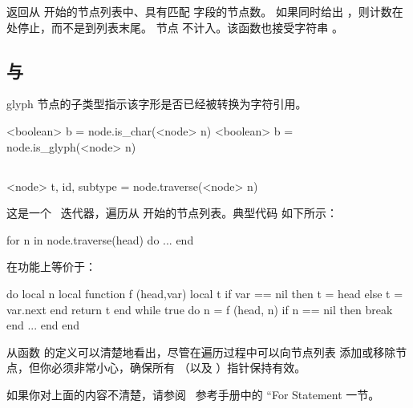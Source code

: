 返回从  开始的节点列表中、具有匹配  字段的节点数。
如果同时给出 ，则计数在  处停止，而不是到列表末尾。
节点  不计入。该函数也接受字符串 。

\subsection{ 与 }


glyph 节点的子类型指示该字形是否已经被转换为字符引用。

\begin{typing}
<boolean> b =
    node.is_char(<node> n)
<boolean> b =
    node.is_glyph(<node> n)
\end{typing}

\subsection{}


\begin{typing}
<node> t, id, subtype =
    node.traverse(<node> n)
\end{typing}

这是一个 \LUA\ 迭代器，遍历从  开始的节点列表。典型代码
如下所示：

\begin{typing}
for n in node.traverse(head) do
   ...
end
\end{typing}

在功能上等价于：

\begin{typing}
do
  local n
  local function f (head,var)
    local t
    if var == nil then
       t = head
    else
       t = var.next
    end
    return t
  end
  while true do
    n = f (head, n)
    if n == nil then break end
    ...
  end
end
\end{typing}

从函数  的定义可以清楚地看出，尽管在遍历过程中可以向节点列表
添加或移除节点，但你必须非常小心，确保所有 （以及
）指针保持有效。

如果你对上面的内容不清楚，请参阅 \LUA\ 参考手册中的
``For Statement 一节。

\subsection{}

